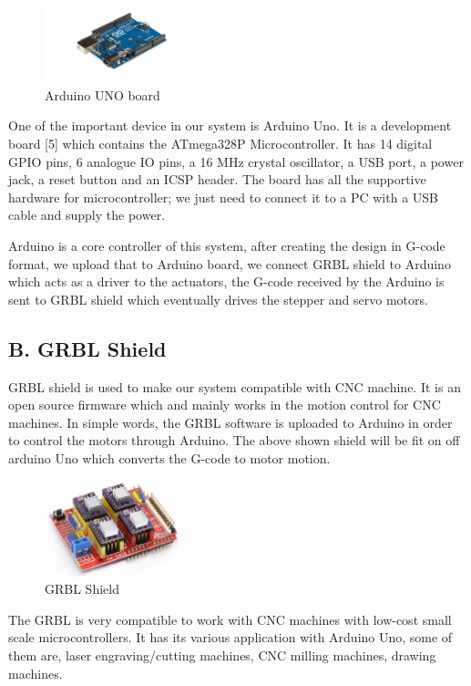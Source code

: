 \documentclass[conference]{IEEEtran}
\begin{document}
\begin{figure}[h]
    \raggedright
    \includegraphics[width=0.4\textwidth]{arduino_uno_board.png}
    \caption{Arduino UNO board}
\end{figure}

One of the important device in our system is Arduino Uno. It is
a development board [5] which contains the ATmega328P
Microcontroller. It has 14 digital GPIO pins, 6 analogue IO
pins, a 16 MHz crystal oscillator, a USB port, a power jack, a
reset button and an ICSP header. The board has all the
supportive hardware for microcontroller; we just need to
connect it to a PC with a USB cable and supply the power.

Arduino is a core controller of this system, after creating the
design in G-code format, we upload that to Arduino board, we
connect GRBL shield to Arduino which acts as a driver to the
actuators, the G-code received by the Arduino is sent to GRBL
shield which eventually drives the stepper and servo motors.

\vspace{10pt}

\subsection*{\textbf{B. GRBL Shield}}


GRBL shield is used to make our system compatible with CNC
machine. It is an open source firmware which and mainly works
in the motion control for CNC machines. In simple words, the
GRBL software is uploaded to Arduino in order to control the
motors through Arduino. The above shown shield will be fit on
off arduino Uno which converts the G-code to motor motion.

\vspace{5pt}

\begin{figure}[h]
    \raggedright
    \includegraphics[width=0.35\textwidth]{grbl.png}
    \caption{GRBL Shield}
\end{figure}
The GRBL is very compatible to work with CNC machines
with low-cost small scale microcontrollers. It has its various
application with Arduino Uno, some of them are, laser
engraving/cutting machines, CNC milling machines, drawing
machines.
\end{document}
